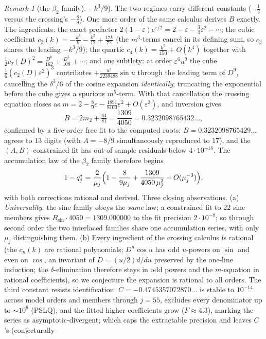 \documentclass[11pt]{article}
\theoremstyle{plain}
\theoremstyle{definition}
\theoremstyle{remark}
\newtheorem{remark}[theorem]{Remark}
\begin{document}
\begin{remark}[the $\beta_2$ family]
$-k^3/9$). The two regimes carry different constants ($-\tfrac12$ versus the crossing's
$-\tfrac89$). One more order of the same calculus derives $B$ exactly. The ingredients:
the exact prefactor $2(1-\varepsilon)e^{\varepsilon/2}=2-\varepsilon-\tfrac34\varepsilon^2-\cdots$;
the cubic coefficient $c_3(k)=-\tfrac{k^3}9-\tfrac{k^2}{12}+\tfrac{17k}{72}$ (the $m^3$-terms
cancel in its defining sum, so $c_3$ shares the leading $-k^3/9$); the quartic
$c_4(k)=\tfrac{k^5}{450}+O(k^4)$ together with $\tfrac12c_2(D)^2=\tfrac{D^6}{162}+\tfrac{D^5}{108}+\cdots$;
and one subtlety: at order $\varepsilon^6u^9$ the cube $\tfrac16(c_2(D)\varepsilon^2)^3$
contributes $+\tfrac{u^9}{2239488}\sin u$ through the leading term of $D^9$, cancelling the
$\delta^3/6$ of the cosine expansion \emph{identically}; truncating the exponential before the
cube gives a spurious $m^5$-term. With that cancellation the crossing equation closes as
$m=2-\tfrac89\varepsilon-\tfrac{1891}{8100}\varepsilon^2+O(\varepsilon^3)$, and inversion gives
\[
   B=2m_2+\tfrac{64}{81}=\frac{1309}{4050}=0.3232098765432\ldots,
\]
confirmed by a five-order free fit to the computed roots: $B=0.3232098765429\ldots$ agrees to
$13$ digits (with $A=-8/9$ simultaneously reproduced to $17$), and the $(A,B)$-constrained fit has
out-of-sample residuals below $4\cdot10^{-16}$. The accumulation law of the $\beta_2$ family
therefore begins
\[
   1-q^\ast_j=\frac{2}{\mu_j}\Bigl(1-\frac{8}{9\mu_j}+\frac{1309}{4050\,\mu_j^2}
   +O(\mu_j^{-3})\Bigr),
\]
with both corrections rational and derived. Three closing observations. (a) \emph{Universality}:
the sine family obeys the \emph{same} law; a constrained fit to $22$ sine members gives
$B_{\sin}\cdot4050=1309.000000$ to the fit precision $2\cdot10^{-8}$; so through second order
the two interlaced families share one accumulation series, with only $\mu_j$ distinguishing them.
(b) Every ingredient of the crossing calculus is rational (the $c_n(k)$ are rational polynomials;
$D^n\cos u$ has odd $u$-powers on $\sin$ and even on $\cos$, an invariant of $D=(u/2)d/du$
preserved by the one-line induction; the $\delta$-elimination therefore stays in odd powers and
the $m$-equation in rational coefficients), so we conjecture the expansion is rational to all
orders. The third constant resists identification: $C=-0.4745357072870\ldots$ is stable to
$10^{-14}$ across model orders and members through $j=55$, excludes every denominator up to
$\sim10^6$ (PSLQ), and the fitted higher coefficients grow ($F\approx4.3$), marking the series as
asymptotic-divergent; which caps the extractable precision and leaves $C$'s (conjecturally

\end{remark}
\end{document}
